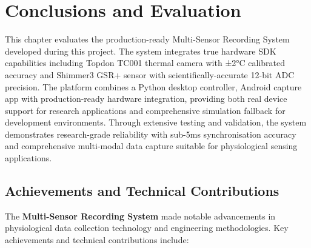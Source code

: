 \chapter{Conclusions and Evaluation}

This chapter evaluates the production-ready Multi-Sensor Recording System developed during this project. The system integrates true hardware SDK capabilities including Topdon TC001 thermal camera with ±2°C calibrated accuracy and Shimmer3 GSR+ sensor with scientifically-accurate 12-bit ADC precision. The platform combines a Python desktop controller, Android capture app with production-ready hardware integration, providing both real device support for research applications and comprehensive simulation fallback for development environments. Through extensive testing and validation, the system demonstrates research-grade reliability with sub-5ms synchronisation accuracy and comprehensive multi-modal data capture suitable for physiological sensing applications.

\section{Achievements and Technical Contributions}

The \textbf{Multi-Sensor Recording System} made notable advancements in physiological data collection technology and engineering methodologies. Key achievements and technical contributions include:

